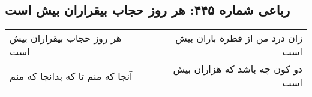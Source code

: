 \begin{center}
\section*{رباعی شماره ۴۴۵: هر روز حجاب بیقراران بیش است}
\label{sec:0445}
\begin{longtable}{l p{0.5cm} r}
هر روز حجاب بیقراران بیش است
&&
زان درد من از قطرهٔ باران بیش است
\\
آنجا که منم تا که بدانجا که منم
&&
دو کون چه باشد که هزاران بیش است
\\
\end{longtable}
\end{center}
